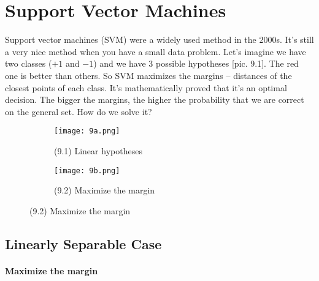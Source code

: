 \chapter{Support Vector Machines}

{\sf Support vector machines (SVM) were a widely used method in the 2000s. It's still a very nice method when you have a small data problem. Let's imagine we have two classes ($+1$ and $-1$) and we have 3 possible hypotheses [pic. 9.1]. The red one is better than others. So SVM maximizes the margins -- distances of the closest points of each class. It's mathematically proved that it's an optimal decision. The bigger the margins, the higher the probability that we are correct on the general set. How do we solve it?}
\begin{figure}[h]
  \centering
  \begin{subfigure}[c]{0.4\linewidth}
    \texttt{[image: 9a.png]}
    \caption*{(9.1) Linear hypotheses}
  \end{subfigure}
  \hspace{2cm}
  \begin{subfigure}[c]{0.35\linewidth}
    \texttt{[image: 9b.png]}
    \caption*{(9.2) Maximize the margin}
  \end{subfigure}
  \vspace{-0.4cm}
\end{figure}

\section{Linearly Separable Case}
\vspace{-0.6cm}
\subsubsection*{Maximize the margin}

